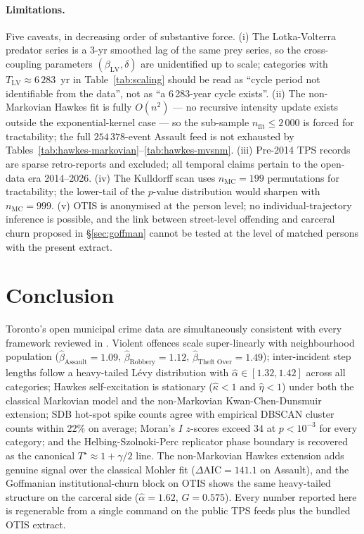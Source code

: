 \documentclass[11pt,a4paper]{article}
\newcommand{\1}{\mathbf{1}}
\theoremstyle{plain}
\theoremstyle{definition}
\begin{document}
\paragraph{Limitations.}  Five caveats, in decreasing order of
substantive force.  (i) The Lotka-Volterra predator series is a
3-yr smoothed lag of the same prey series, so the cross-coupling
parameters $(\beta_{\mathrm{LV}},\delta)$ are unidentified up to
scale; categories with $T_{\mathrm{LV}}\approx 6\,283$~yr in
Table~\ref{tab:scaling} should be read as ``cycle period not
identifiable from the data'', not as ``a 6\,283-year cycle exists''.
(ii) The non-Markovian Hawkes fit is fully $O(n^2)$ — no recursive
intensity update exists outside the exponential-kernel case — so
the sub-sample $n_{\mathrm{fit}}\le 2\,000$ is forced for
tractability; the full $254\,378$-event Assault feed is not
exhausted by Tables~\ref{tab:hawkes-markovian}--\ref{tab:hawkes-mvsnm}.
(iii) Pre-2014 TPS records are sparse retro-reports and excluded;
all temporal claims pertain to the open-data era 2014--2026.
(iv) The Kulldorff scan uses $n_{\mathrm{MC}}=199$ permutations for
tractability; the lower-tail of the $p$-value distribution would
sharpen with $n_{\mathrm{MC}}=999$.  (v) OTIS is anonymised at
the person level; no individual-trajectory inference is possible,
and the link between street-level offending and carceral churn
proposed in §\ref{sec:goffman} cannot be tested at the level of
matched persons with the present extract.

\section{Conclusion}\label{sec:conclusion}

Toronto's open municipal crime data are simultaneously consistent
with every framework reviewed in \cite{dorsogna2015}.  Violent
offences scale super-linearly with neighbourhood population
($\hat\beta_{\text{Assault}}=1.09$, $\hat\beta_{\text{Robbery}}=1.12$,
$\hat\beta_{\text{Theft Over}}=1.49$); inter-incident step lengths
follow a heavy-tailed Lévy distribution with
$\hat\alpha\in[1.32,1.42]$ across all categories; Hawkes
self-excitation is stationary ($\hat\kappa<1$ and $\hat\eta<1$)
under both the classical Markovian model and the non-Markovian
Kwan-Chen-Dunsmuir extension; SDB hot-spot spike counts agree with
empirical DBSCAN cluster counts within 22\% on average; Moran's
$I$ $z$-scores exceed $34$ at $p<10^{-3}$ for every category; and
the Helbing-Szolnoki-Perc replicator phase boundary is recovered
as the canonical $T^\star\approx 1+\gamma/2$ line.  The
non-Markovian Hawkes extension adds genuine signal over the
classical Mohler fit ($\Delta\mathrm{AIC}=141.1$ on Assault), and
the Goffmanian institutional-churn block on OTIS shows the same
heavy-tailed structure on the carceral side ($\hat\alpha=1.62$,
$G=0.575$).  Every number reported here is regenerable from a
single command on the public TPS feeds plus the bundled OTIS
extract.
\end{document}
